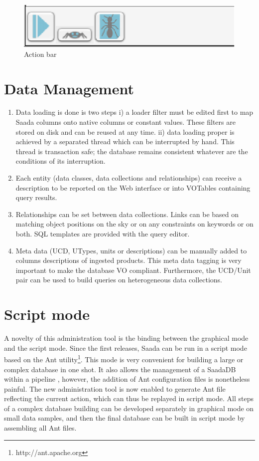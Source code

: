 \begin{figure}[!h]
	\begin{center}
		\includegraphics[height=0.10\textwidth]{part8/MICHEL_P18/P18_fig3.eps}
	\end{center}
	\caption{Action bar}
	\label{fig:fig3 (fig. 4)}
\end{figure}

\section{Data Management}
\begin{enumerate}
\item Data loading is done is two steps i) a loader filter must be edited first to map Saada columns onto native columns or constant values. These filters are stored on disk and can be reused at any time. ii) data loading proper is achieved by a separated thread which can be interrupted by hand. This thread is transaction safe; the database remains consistent whatever are the conditions of its interruption.
\item Each entity (data classes, data collections and relationships) can receive a description to be reported on the Web interface or into VOTables containing query results.
\item Relationships can be set between data collections. Links can be based on matching object positions on the sky or on any constraints on keywords or on both. SQL templates are provided with the query editor.
\item Meta data (UCD, UTypes, units or descriptions) can be manually added to columns descriptions of ingested products. This meta data tagging is very important to make the database VO compliant. Furthermore, the UCD/Unit pair can be used to build queries on heterogeneous data collections.
\end{enumerate}

\section{Script mode}
A novelty of this administration tool is the binding between the graphical mode and the script mode. Since the first releases, Saada can be run in a script mode based on the Ant utility\footnote{http://ant.apache.org}. This mode is very convenient for building a large or complex database in one shot. It also allows the management of a SaadaDB within a pipeline \citep{P03_adassxxii}, however, the addition of Ant configuration files is nonetheless painful. The new administration tool is now enabled to generate Ant file reflecting the current action, which can thus be replayed in script mode. All steps of a complex database building can be developed separately in graphical mode on small data samples, and then the final database can be built in script mode by assembling all Ant files.

